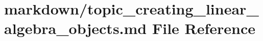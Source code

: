 \hypertarget{topic__creating__linear__algebra__objects_8md}{}\section{markdown/topic\+\_\+creating\+\_\+linear\+\_\+algebra\+\_\+objects.md File Reference}
\label{topic__creating__linear__algebra__objects_8md}
